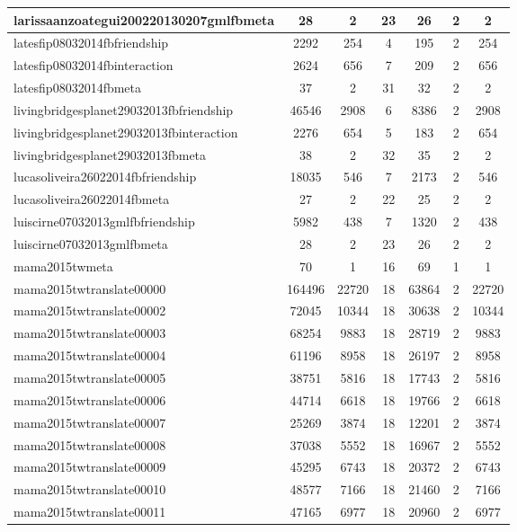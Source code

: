 \begin{table*}[h!]
\begin{center}
\begin{tabular}{| l | c | c | c | c | c | c |}
larissaanzoategui200220130207gmlfbmeta & 28  & 2  & 23  & 26  & 2  & 2 \\\hline
latesfip08032014fbfriendship & 2292  & 254  & 4  & 195  & 2  & 254 \\\hline
latesfip08032014fbinteraction & 2624  & 656  & 7  & 209  & 2  & 656 \\\hline
latesfip08032014fbmeta & 37  & 2  & 31  & 32  & 2  & 2 \\\hline
livingbridgesplanet29032013fbfriendship & 46546  & 2908  & 6  & 8386  & 2  & 2908 \\\hline
livingbridgesplanet29032013fbinteraction & 2276  & 654  & 5  & 183  & 2  & 654 \\\hline
livingbridgesplanet29032013fbmeta & 38  & 2  & 32  & 35  & 2  & 2 \\\hline
lucasoliveira26022014fbfriendship & 18035  & 546  & 7  & 2173  & 2  & 546 \\\hline
lucasoliveira26022014fbmeta & 27  & 2  & 22  & 25  & 2  & 2 \\\hline
luiscirne07032013gmlfbfriendship & 5982  & 438  & 7  & 1320  & 2  & 438 \\\hline
luiscirne07032013gmlfbmeta & 28  & 2  & 23  & 26  & 2  & 2 \\\hline
mama2015twmeta & 70  & 1  & 16  & 69  & 1  & 1 \\\hline
mama2015twtranslate00000 & 164496  & 22720  & 18  & 63864  & 2  & 22720 \\\hline
mama2015twtranslate00002 & 72045  & 10344  & 18  & 30638  & 2  & 10344 \\\hline
mama2015twtranslate00003 & 68254  & 9883  & 18  & 28719  & 2  & 9883 \\\hline
mama2015twtranslate00004 & 61196  & 8958  & 18  & 26197  & 2  & 8958 \\\hline
mama2015twtranslate00005 & 38751  & 5816  & 18  & 17743  & 2  & 5816 \\\hline
mama2015twtranslate00006 & 44714  & 6618  & 18  & 19766  & 2  & 6618 \\\hline
mama2015twtranslate00007 & 25269  & 3874  & 18  & 12201  & 2  & 3874 \\\hline
mama2015twtranslate00008 & 37038  & 5552  & 18  & 16967  & 2  & 5552 \\\hline
mama2015twtranslate00009 & 45295  & 6743  & 18  & 20372  & 2  & 6743 \\\hline
mama2015twtranslate00010 & 48577  & 7166  & 18  & 21460  & 2  & 7166 \\\hline
mama2015twtranslate00011 & 47165  & 6977  & 18  & 20960  & 2  & 6977 \\\hline

\end{tabular}
\end{center}
\end{table*}
